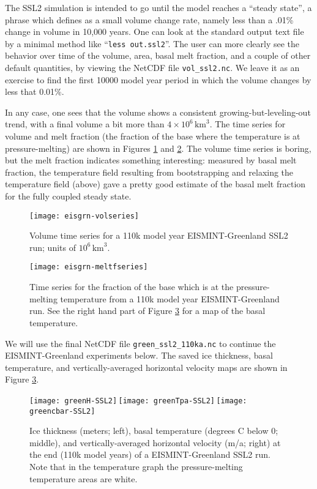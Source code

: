 The SSL2 simulation is intended to go until the model reaches a ``steady state'', a phrase which \cite{RitzEISMINT} defines as a small volume change rate, namely less than a .01\% change in volume in 10,000 years.  One can look at the standard output text file by a minimal method like ``\texttt{less out.ssl2}''.  The user can more clearly see the behavior over time of the volume, area, basal melt fraction, and a couple of other default quantities, by viewing the NetCDF file \texttt{vol_ssl2.nc}.  We leave it as an exercise to find the first 10000 model year period in which the volume changes by less that 0.01\%.

In any case, one sees that the volume shows a consistent growing-but-leveling-out trend, with a final volume a bit more than $4 \times 10^{6}\,\text{km}^3$.  The time series for volume and melt fraction (the fraction of the base where the temperature is at pressure-melting) are shown in Figures \ref{fig:eisgrnvolseries} and \ref{fig:eisgrnmeltfseries}.  The volume time series is boring, but the melt fraction indicates something interesting: measured by basal melt fraction, the temperature field resulting from bootstrapping and relaxing the temperature field (above) gave a pretty good estimate of the basal melt fraction for the fully coupled steady state.

\begin{figure}[ht]
\centering
\texttt{[image: eisgrn-volseries]}
\caption{Volume time series for a 110k model year EISMINT-Greenland SSL2 run; units of $10^{6}\,\text{km}^3$.}
\label{fig:eisgrnvolseries}
\end{figure}

\begin{figure}[ht]
\centering
\texttt{[image: eisgrn-meltfseries]}
\caption{Time series for the fraction of the base which is at the pressure-melting temperature from a 110k model year EISMINT-Greenland run.  See the right hand part of Figure \ref{fig:ssl2thickTpa} for a map of the basal temperature.}
\label{fig:eisgrnmeltfseries}
\end{figure}

We will use the final NetCDF file \texttt{green_ssl2_110ka.nc} to continue the EISMINT-Greenland experiments below.  The saved ice thickness, basal temperature, and vertically-averaged horizontal velocity maps are shown in Figure \ref{fig:ssl2thickTpa}.

\begin{figure}[ht]
\centering
\mbox{\phantom{|}\hspace{-1.0in}\texttt{[image: greenH-SSL2]}\,\texttt{[image: greenTpa-SSL2]}\,\texttt{[image: greencbar-SSL2]}}
\caption{Ice thickness (meters; left), basal temperature (degrees C below 0; middle), and vertically-averaged horizontal velocity (m/a; right) at the end (110k model years) of a EISMINT-Greenland SSL2 run.  Note that in the temperature graph the pressure-melting temperature areas are white.}
\label{fig:ssl2thickTpa}
\end{figure}

